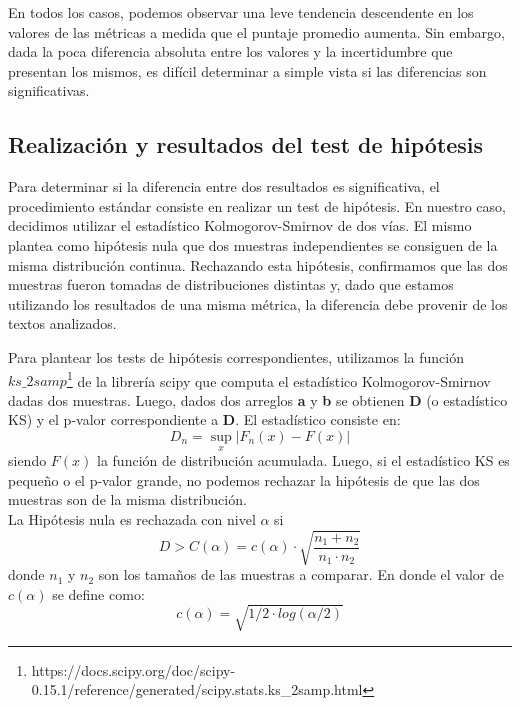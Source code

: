 \documentclass[12pt,journal,compsoc]{IEEEtran}
\begin{document}
En todos los casos, podemos observar una leve tendencia descendente en los valores de las métricas a medida que el puntaje promedio aumenta. Sin embargo, dada la poca diferencia absoluta entre los valores y la incertidumbre que presentan los mismos, es difícil determinar a simple vista si las diferencias son significativas.

\subsection{Realización y resultados del test de hipótesis}

Para determinar si la diferencia entre dos resultados es significativa, el procedimiento estándar consiste en realizar un test de hipótesis. En nuestro caso, decidimos utilizar el estadístico Kolmogorov-Smirnov de dos vías. El mismo plantea como hipótesis nula que dos muestras independientes se consiguen de la misma distribución continua. Rechazando esta hipótesis, confirmamos que las dos muestras fueron tomadas de distribuciones distintas y, dado que estamos utilizando los resultados de una misma métrica, la diferencia debe provenir de los textos analizados.

Para plantear los tests de hipótesis correspondientes, utilizamos la función $ks\_2samp$\footnote{https://docs.scipy.org/doc/scipy-0.15.1/reference/generated/scipy.stats.ks\_2samp.html} de la librería scipy que computa el estadístico Kolmogorov-Smirnov dadas dos muestras. Luego, dados dos arreglos \textbf{a} y \textbf{b} se obtienen \textbf{D} (o estadístico KS) y el p-valor correspondiente a \textbf{D}. El estadístico consiste en:
$$D_{n}=\sup_{x}|F_{n}(x)-F(x)|$$ \label{eq:1}
siendo $F(x)$ la función de distribución acumulada. Luego, si el estadístico KS es pequeño o el p-valor grande, no podemos rechazar la hipótesis de que las dos muestras son de la misma distribución\cite{degroot}.\\

La Hipótesis nula es rechazada con nivel $\alpha$ si $$D > C(\alpha) = c(\alpha) \cdot \sqrt{\frac{n_1+n_2}{n_1\cdot n_2}}$$ donde $n_1$ y $n_2$ son los tamaños de las muestras a comparar. En donde el valor de $c(\alpha)$ se define como:
$$c(\alpha) = \sqrt{1/2\cdot log(\alpha/2)}$$
\end{document}

